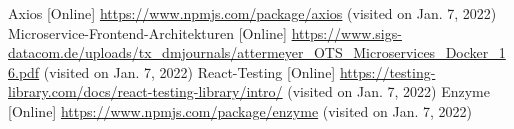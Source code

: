 \documentclass[conference]{IEEEtran}
\begin{document}
\begin{thebibliography}{0}
	Axios [Online] \url{https://www.npmjs.com/package/axios} (visited on Jan. 7, 2022)
    Microservice-Frontend-Architekturen [Online] \url{https://www.sigs-datacom.de/uploads/tx_dmjournals/attermeyer_OTS_Microservices_Docker_16.pdf} (visited on Jan. 7, 2022)
    React-Testing [Online] \url{https://testing-library.com/docs/react-testing-library/intro/} (visited on Jan. 7, 2022)
    Enzyme [Online] \url{https://www.npmjs.com/package/enzyme} (visited on Jan. 7, 2022)  
\end{thebibliography}
\end{document}
